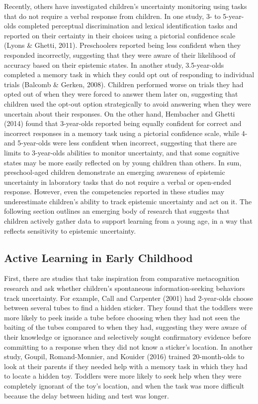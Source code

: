 \documentclass[a4paper,man,apacite,floatsintext]{apa6}
\begin{document}
Recently, others have investigated children's uncertainty monitoring
using tasks that do not require a verbal response from children. In one
study, 3- to 5-year-olds completed perceptual discrimination and lexical
identification tasks and reported on their certainty in their choices
using a pictorial confidence scale (Lyons \& Ghetti, 2011). Preschoolers
reported being less confident when they responded incorrectly,
suggesting that they were aware of their likelihood of accuracy based on
their epistemic states. In another study, 3.5-year-olds completed a
memory task in which they could opt out of responding to individual
trials (Balcomb \& Gerken, 2008). Children performed worse on trials
they had opted out of when they were forced to answer them later on,
suggesting that children used the opt-out option strategically to avoid
answering when they were uncertain about their responses. On the other
hand, Hembacher and Ghetti (2014) found that 3-year-olds reported being
equally confident for correct and incorrect responses in a memory task
using a pictorial confidence scale, while 4- and 5-year-olds were less
confident when incorrect, suggesting that there are limits to
3-year-olds abilities to monitor uncertainty, and that some cognitive
states may be more easily reflected on by young children than others. In
sum, preschool-aged children demonstrate an emerging awareness of
epistemic uncertainty in laboratory tasks that do not require a verbal
or open-ended response. However, even the competencies reported in these
studies may underestimate children's ability to track epistemic
uncertainty and act on it. The following section outlines an emerging
body of research that suggests that children actively gather data to
support learning from a young age, in a way that reflects sensitivity to
epistemic uncertainty.

\subsection{Active Learning in Early
Childhood}\label{active-learning-in-early-childhood}

First, there are studies that take inspiration from comparative
metacognition research and ask whether children's spontaneous
information-seeking behaviors track uncertainty. For example, Call and
Carpenter (2001) had 2-year-olds choose between several tubes to find a
hidden sticker. They found that the toddlers were more likely to peek
inside a tube before choosing when they had not seen the baiting of the
tubes compared to when they had, suggesting they were aware of their
knowledge or ignorance and selectively sought confirmatory evidence
before committing to a response when they did not know a sticker's
location. In another study, Goupil, Romand-Monnier, and Kouider (2016)
trained 20-month-olds to look at their parents if they needed help with
a memory task in which they had to locate a hidden toy. Toddlers were
more likely to seek help when they were completely ignorant of the toy's
location, and when the task was more difficult because the delay between
hiding and test was longer.
\end{document}
